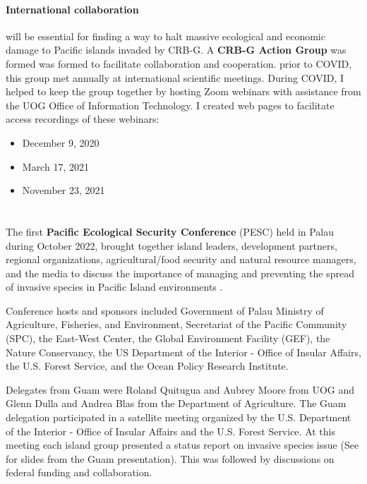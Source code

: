 \begin{refsection}
\paragraph{International collaboration} will be essential for finding a way to halt massive ecological and economic damage to Pacific islands invaded by CRB-G. A \textbf{CRB-G Action Group} was formed was formed to facilitate collaboration and cooperation. prior to COVID, this group met annually at international scientific meetings. During COVID, I helped to keep the group together by hosting Zoom webinars with assistance from the UOG Office of Information Technology. I created web pages to facilitate access recordings of these webinars: 
\begin{itemize}
	\item December 9, 2020 \cite{moore_video_2020}
	\item March 17, 2021 \cite{moore_video_2021-1}
	\item November 23, 2021 \cite{moore_video_2021}	
\end{itemize}

\section{}

The first \textbf{Pacific Ecological Security Conference} (PESC) held in Palau during October 2022, brought together island leaders, development partners, regional organizations, agricultural/food security and natural resource managers, and the media to discuss the importance of managing and preventing the spread of invasive species in Pacific Island environments \cite{anonymousFirstPacificEcological2022}.

Conference hosts and sponsors included Government of Palau Ministry of Agriculture, Fisheries, and Environment, Secretariat of the Pacific Community (SPC), the East-West Center, the Global Environment Facility (GEF), the Nature Conservancy, the US Department of the Interior - Office of Insular Affairs, the U.S. Forest Service, and the Ocean Policy Research Institute.

Delegates from Guam were Roland Quitugua and Aubrey Moore from UOG and Glenn Dulla and Andrea Blas from the Department of Agriculture. The Guam delegation participated in a satellite meeting organized by the U.S. Department of the Interior - Office of Insular Affairs and the U.S. Forest Service. At this meeting each island group presented a status report on invasive species issue (See \parencite{mooreOverviewInvasiveSpecies2022-10-06} for slides from the Guam presentation). This was followed by discussions on federal funding and collaboration.  


\end{refsection}
